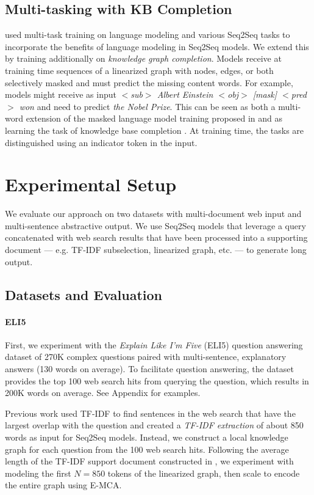 \documentclass[11pt,a4paper]{article}
\begin{document}
\subsection{Multi-tasking with KB Completion} \citet{fan2019explain} used multi-task training on language modeling and various Seq2Seq tasks to incorporate the benefits of language modeling in Seq2Seq models. We extend this by training additionally on \textit{knowledge graph completion}. Models receive at training time sequences of a linearized graph with nodes, edges, or both selectively masked and must predict the missing content words. For example, models might receive as input \textit{$<$sub$>$ Albert Einstein $<$obj$>$ [mask] $<$pred$>$ won} and need to predict \textit{the Nobel Prize}. This can be seen as both a multi-word extension of the masked language model training proposed in \cite{devlin2018bert} and as learning the task of knowledge base completion \cite{lacroix2018canonical,bordes2011learning}. At training time, the tasks are distinguished using an indicator token in the input. 

\section{Experimental Setup} 

We evaluate our approach on two datasets with multi-document web input and multi-sentence abstractive output. We use Seq2Seq models that leverage a  query concatenated with web search results that have been processed into a supporting document --- e.g. TF-IDF subselection, linearized graph, etc. --- to generate long output.  

\subsection{Datasets and Evaluation} 

\paragraph{ELI5} First, we experiment with the \textit{Explain Like I'm Five} (ELI5) \cite{fan2019explain} question answering dataset of 270K complex questions paired with multi-sentence, explanatory answers (130 words on average). To facilitate question answering, the dataset provides the top 100 web search hits from querying the question, which results in 200K words on average. See Appendix for examples. 

Previous work \cite{fan2019explain} used TF-IDF to find sentences in the web search that have the largest overlap with the question and created a \textit{TF-IDF extraction} of about 850 words as input for Seq2Seq models. Instead, we construct a local knowledge graph for each question from the 100 web search hits. Following the average length of the TF-IDF support document constructed in \cite{fan2019explain}, we experiment with modeling the first $N = 850$ tokens of the linearized graph, then scale to encode the entire graph using E-MCA. 
\end{document}
